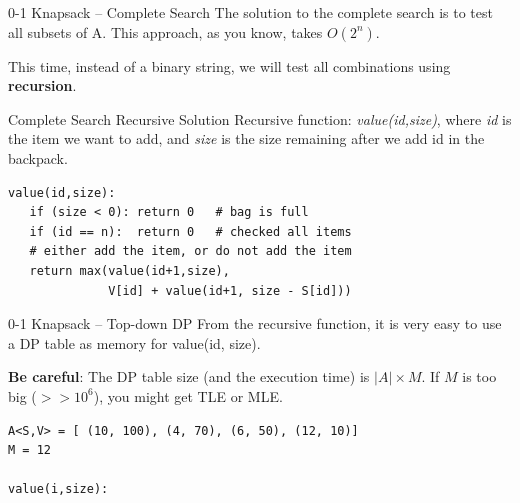 \begin{frame}[fragile]{0-1 Knapsack -- Complete Search}
  The solution to the complete search is to test all subsets of A. This approach, as you know, takes $O(2^n)$.\bigskip

  This time, instead of a binary string, we will test all combinations using {\bf recursion}.

  \begin{block}{Complete Search Recursive Solution}
    Recursive function: \emph{value(id,size)}, where \emph{id} is the item we want to add, and \emph{size} is the size remaining after we add id in the backpack.\medskip

\begin{verbatim}
value(id,size):
   if (size < 0): return 0   # bag is full
   if (id == n):  return 0   # checked all items
   # either add the item, or do not add the item
   return max(value(id+1,size),
              V[id] + value(id+1, size - S[id]))
\end{verbatim}
  \end{block}
\end{frame}

\begin{frame}[fragile]{0-1 Knapsack -- Top-down DP}
  From the recursive function, it is very easy to use a DP table as memory for value(id, size).\medskip

    {\bf Be careful}: The DP table size (and the execution time) is $|A|\times M$. If $M$ is too big ($>> 10^6$), you might get TLE or MLE.
\begin{verbatim}
A<S,V> = [ (10, 100), (4, 70), (6, 50), (12, 10)]
M = 12

value(i,size):
\end{verbatim}

  \begin{center}
  \bigskip
  \end{center}


\end{frame}

